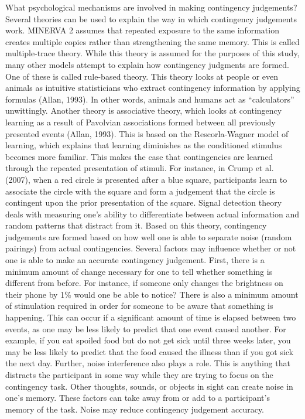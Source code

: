 \documentclass[
  english,
  man,floatsintext]{apa6}
\begin{document}
What psychological mechanisms are involved in making contingency judgements? Several theories can be used to explain the way in which contingency judgements work. MINERVA 2 assumes that repeated exposure to the same information creates multiple copies rather than strengthening the same memory. This is called multiple-trace theory. While this theory is assumed for the purposes of this study, many other models attempt to explain how contingency judgments are formed. One of these is called rule-based theory. This theory looks at people or even animals as intuitive statisticians who extract contingency information by applying formulas (Allan, 1993). In other words, animals and humans act as \enquote{calculators} unwittingly. Another theory is associative theory, which looks at contingency learning as a result of Pavolvian associations formed between all previously presented events (Allan, 1993). This is based on the Rescorla-Wagner model of learning, which explains that learning diminishes as the conditioned stimulus becomes more familiar. This makes the case that contingencies are learned through the repeated presentation of stimuli. For instance, in Crump et al. (2007), when a red circle is presented after a blue square, participants learn to associate the circle with the square and form a judgement that the circle is contingent upon the prior presentation of the square. Signal detection theory deals with measuring one's ability to differentiate between actual information and random patterns that distract from it. Based on this theory, contingency judgements are formed based on how well one is able to separate noise (random pairings) from actual contingencies. Several factors may influence whether or not one is able to make an accurate contingency judgement. First, there is a minimum amount of change necessary for one to tell whether something is different from before. For instance, if someone only changes the brightness on their phone by 1\% would one be able to notice? There is also a minimum amount of stimulation required in order for someone to be aware that something is happening. This can occur if a significant amount of time is elapsed between two events, as one may be less likely to predict that one event caused another. For example, if you eat spoiled food but do not get sick until three weeks later, you may be less likely to predict that the food caused the illness than if you got sick the next day. Further, noise interference also plays a role. This is anything that distracts the participant in some way while they are trying to focus on the contingency task. Other thoughts, sounds, or objects in sight can create noise in one's memory. These factors can take away from or add to a participant's memory of the task. Noise may reduce contingency judgement accuracy.
\end{document}
